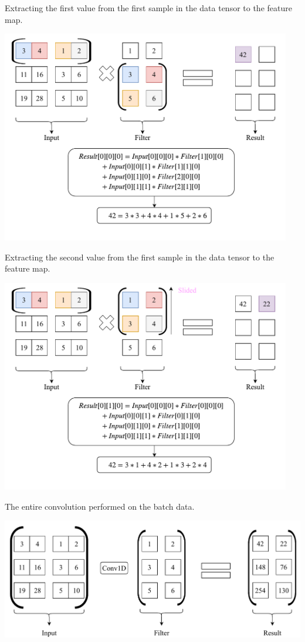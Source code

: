 \documentclass[12pt]{article}
\begin{document}
\begin{blockfigure}{ Extracting the first value from the first sample in the data tensor to the feature map.}
	\begin{center}
		\includegraphics[width=0.95\textwidth]{secondConvSample_step1}
	\end{center}
\end{blockfigure}
\begin{blockfigure}{Extracting the second value from the first sample in the data tensor to the feature map.}
	\begin{center}
		\includegraphics[width=0.95\textwidth]{secondConvSample_step2}
	\end{center}
\end{blockfigure}
\newpage
\begin{blockfigure}{The entire convolution performed on the batch data.}
	\begin{center}
		\includegraphics[width=\textwidth]{secondConvSample_final}
	\end{center}
\end{blockfigure}
\end{document}
